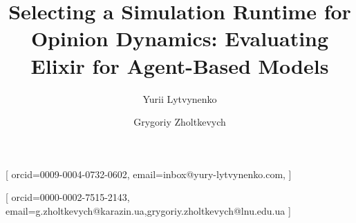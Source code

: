 \documentclass[
]{ceurart}
\begin{document}




\author[1]{Yurii Lytvynenko}[%
orcid=0009-0004-0732-0602, %
email=inbox@yury-lytvynenko.com,
]
\cormark[1]
\fnmark[1]

\author[1,2]{Grygoriy Zholtkevych}[%
orcid=0000-0002-7515-2143, %
email={g.zholtkevych@karazin.ua,grygoriy.zholtkevych@lnu.edu.ua}
]
\fnmark[1]
\address[1]{V.N. Karazin Kharkiv National University,
  4 Svobody sq., Kharkiv, 61022, Ukraine}
\address[2]{Ivan Franko National University of Lviv,
  1 Universyteska Str., Lviv, 79007, Ukraine}




\title{Selecting a Simulation Runtime for Opinion Dynamics: Evaluating Elixir for Agent-Based Models}
\end{document}
